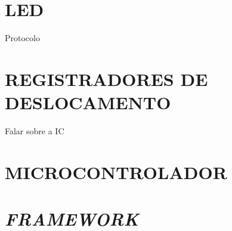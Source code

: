 

\section{LED}
\label{sec:led}
Protocolo

\section{REGISTRADORES DE DESLOCAMENTO}
\label{sec:registradores}
Falar sobre a IC

\section{MICROCONTROLADOR}
\label{sec:microcontrolador}

\section{\emph{FRAMEWORK}}
\label{sec:framework}

